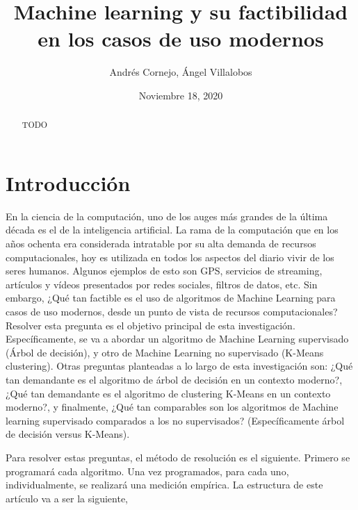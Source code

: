 \documentclass{article}
\author{Andrés Cornejo, Ángel Villalobos}
\date{Noviembre 18, 2020}
\title{Machine learning y su factibilidad en los casos de uso modernos}
\begin{document}
\maketitle

\begin{abstract}
  TODO
\end{abstract}

\section{Introducción}
En la ciencia de la computación, uno de los auges más grandes de la última década es el de la inteligencia artificial. La rama de la computación que en los años ochenta era considerada intratable por su alta demanda de recursos computacionales, hoy es utilizada en todos los aspectos del diario vivir de los seres humanos. Algunos ejemplos de esto son GPS, servicios de streaming, artículos y vídeos presentados por redes sociales, filtros de datos, etc. Sin embargo, ¿Qué tan factible es el uso de algoritmos de Machine Learning para casos de uso modernos, desde un punto de vista de recursos computacionales? Resolver esta pregunta es el objetivo principal de esta investigación. Específicamente, se va a abordar un algoritmo de Machine Learning supervisado (Árbol de decisión), y otro de Machine Learning no supervisado (K-Means clustering). Otras preguntas planteadas a lo largo de esta investigación son: ¿Qué tan demandante es el algoritmo de árbol de decisión en un contexto moderno?, ¿Qué tan demandante es el algoritmo de clustering K-Means en un contexto moderno?, y finalmente, ¿Qué tan comparables son los algoritmos de Machine learning supervisado comparados a los no supervisados? (Específicamente árbol de decisión versus K-Means).

Para resolver estas preguntas, el método de resolución es el siguiente. Primero se programará cada algoritmo. Una vez programados, para cada uno, individualmente, se realizará una medición empírica.
La estructura de este artículo va a ser la siguiente,
\printbibliography
\end{document}
